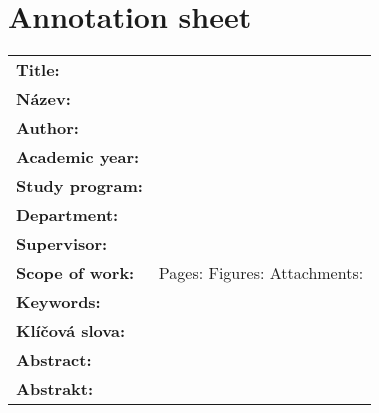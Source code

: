 \section*{Annotation sheet}
\renewcommand{\arraystretch}{1.2}
\begin{tabularx}{\textwidth}{l X}
	\textbf{Title:} & \ThesisTitle \\
	\textbf{Název:} & \ThesisTitleCZ \\
	\textbf{Author:} & \ThesisAuthor \\
	\textbf{Academic year:} & \\
	\textbf{Study program:} & \\
	\textbf{Department: } & \USTAV \\
	\textbf{Supervisor:} & \ThesisSupervisor \\
	\textbf{Scope of work:} &
			Pages: \newline
			Figures: \newline
			Attachments: \\
	\textbf{Keywords:} &  \\
	\textbf{Klíčová slova:} &  \\
	\textbf{Abstract:} & \\
	\textbf{Abstrakt:} & \\
\end{tabularx}